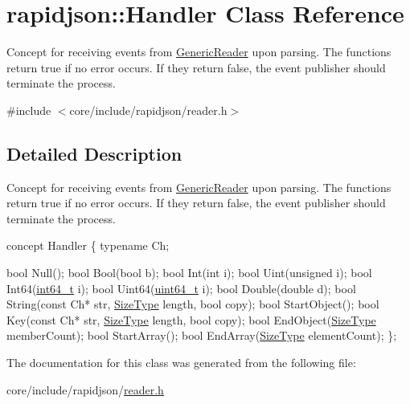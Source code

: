 \hypertarget{classrapidjson_1_1Handler}{}\section{rapidjson\+:\+:Handler Class Reference}
\label{classrapidjson_1_1Handler}


Concept for receiving events from \hyperlink{classGenericReader}{Generic\+Reader} upon parsing. The functions return true if no error occurs. If they return false, the event publisher should terminate the process.  




{\ttfamily \#include $<$core/include/rapidjson/reader.\+h$>$}



\subsection{Detailed Description}
Concept for receiving events from \hyperlink{classGenericReader}{Generic\+Reader} upon parsing. The functions return true if no error occurs. If they return false, the event publisher should terminate the process. 


\begin{DoxyCode}
concept Handler \{
    \textcolor{keyword}{typename} Ch;

    \textcolor{keywordtype}{bool} Null();
    \textcolor{keywordtype}{bool} Bool(\textcolor{keywordtype}{bool} b);
    \textcolor{keywordtype}{bool} Int(\textcolor{keywordtype}{int} i);
    \textcolor{keywordtype}{bool} Uint(\textcolor{keywordtype}{unsigned} i);
    \textcolor{keywordtype}{bool} Int64(\hyperlink{stdint_8h_a414156feea104f8f75b4ed9e3121b2f6}{int64\_t} i);
    \textcolor{keywordtype}{bool} Uint64(\hyperlink{stdint_8h_aec6fcb673ff035718c238c8c9d544c47}{uint64\_t} i);
    \textcolor{keywordtype}{bool} Double(\textcolor{keywordtype}{double} d);
    \textcolor{keywordtype}{bool} String(\textcolor{keyword}{const} Ch* str, \hyperlink{rapidjson_8h_a5ed6e6e67250fadbd041127e6386dcb5}{SizeType} length, \textcolor{keywordtype}{bool} copy);
    \textcolor{keywordtype}{bool} StartObject();
    \textcolor{keywordtype}{bool} Key(\textcolor{keyword}{const} Ch* str, \hyperlink{rapidjson_8h_a5ed6e6e67250fadbd041127e6386dcb5}{SizeType} length, \textcolor{keywordtype}{bool} copy);
    \textcolor{keywordtype}{bool} EndObject(\hyperlink{rapidjson_8h_a5ed6e6e67250fadbd041127e6386dcb5}{SizeType} memberCount);
    \textcolor{keywordtype}{bool} StartArray();
    \textcolor{keywordtype}{bool} EndArray(\hyperlink{rapidjson_8h_a5ed6e6e67250fadbd041127e6386dcb5}{SizeType} elementCount);
\};
\end{DoxyCode}
 

The documentation for this class was generated from the following file\+:\begin{DoxyCompactItemize}
\item 
core/include/rapidjson/\hyperlink{reader_8h}{reader.\+h}\end{DoxyCompactItemize}
